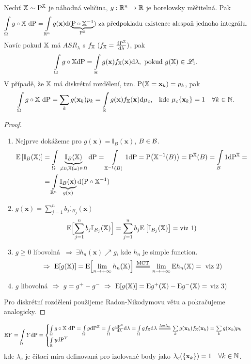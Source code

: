 \begin{theorem}
	Nechť $\mathbb{X}\sim\mathrm{P}^{\mathbb{X}}$ je náhodná veličina, $g:\mathbb{R}^n\to\mathbb{R}$ je borelovsky měřitelná. Pak $$ \int\limits_{\Omega}g\circ \mathbb{X} ~\mathrm{d} \mathrm{P} = \int\limits_{\mathbb{R}^n} g(\textbf{x})\mathrm{d}(\underbrace{\mathrm{P}\circ \mathbb{X}^{-1}}_{\mathrm{P}^{\mathbb{X}}}) \text{ za předpokladu existence alespoň jednoho integrálu.}$$
	Navíc pokud $\mathbb{X}$ má $ASR_\lambda$ s $f_{\mathbb{X}}~(f_{\mathbb{X}}=\frac{\mathrm{d}\mathrm{P}^{\mathbb{X}}}{\mathrm{d}\lambda})$, pak $$ \int\limits_{\Omega}g\circ \mathbb{X} \mathrm{d} \mathrm{P} = \int\limits_{\mathbb{R}} g(\textbf{x})f_{\mathbb{X}}(\textbf{x})\mathrm{d}\lambda,\text{ pokud }g(\mathbb{X})\in\mathscr{L}_1. $$ V případě, že $\mathbb{X}$ má diskrétní rozdělení, tzn. $\mathrm{P}(\mathbb{X}=\textbf{x}_k)=p_k$, pak  $$ \int\limits_{\Omega}g\circ \mathbb{X} ~\mathrm{d} \mathrm{P} =\sum\limits_{k}g(\textbf{x}_k)p_k=\int\limits_{\mathbb{R}} g(\textbf{x})f_{\mathbb{X}}(\textbf{x})\mathrm{d}\mu_c\text{,~~ kde }\mu_c\{ \textbf{x}_k \}=1~~~\forall k \in\mathbb{N}.$$
	\begin{proof}
		\begin{enumerate}
			\item Nejprve dokážeme pro $g(\textbf{x})=\mathbb{I}_B(\textbf{x})$, $B\in\mathcal{B}$. 
			\[
			\begin{split}
			\mathrm{E} \left[ \mathbb{I}_B(\mathbb{X}) \right]&=\int\limits_{\Omega}\underbrace{\mathbb{I}_B(\mathbb{X})}_{\neq 0,\mathbb{X}(\omega)\in B}\mathrm{d} \mathrm{P}=\int\limits_{\mathbb{X}^{-1}(B)} 1 \mathrm{d} \mathrm{P}= \mathrm{P}\bigl(\mathbb{X}^{-1}(B)\bigr)=\mathrm{P}^{\mathbb{X}}(B)=\int\limits_{B}1\mathrm{d}\mathrm{P}^{\mathbb{X}}=\\ &=\int\limits_{\mathbb{R}^n}\underbrace{\mathbb{I}_B(\textbf{x})}_{g(\textbf{x})}\mathrm{d}(\mathrm{P}\circ \mathbb{X}^{-1})
			\end{split}
			\]
			\item $g(\textbf{x})=\sum\limits_{j=1}^n b_j \mathbb{I}_{B_j}(\textbf{x})$ $$ \mathrm{E} \Bigl[ \sum\limits_{j=1}^n b_j \mathbb{I}_{B_j}(\mathbb{X}) \Bigr]=\sum\limits_{j=1}^n b_j \mathrm{E} \left[ \mathbb{I}_{B_j}(\mathbb{X}) \right]=\text{viz 1)} $$
			\item $g\geq 0$ libovolná $~\Rightarrow~ \exists h_n(\textbf{x})\nearrow g$, kde  $h_n$ je simple function.
			$$~\Rightarrow~ \E [g(\X)]=\E \Bigl[ \lim\limits_{ n\to +\infty} h_n(\X) \Bigr]\equal{\text{MCT}}\lim\limits_{ n\to +\infty} \E h_n(\X)=\text{ viz 2)}$$ 
			\item $g$ libovolná $~\Rightarrow~ g=g^+-g^- ~\Rightarrow~ \mathrm{E} [g(\mathbb{X})]=\mathrm{E} g^+(\mathbb{X})-\mathrm{E} g^-(\mathbb{X})=$ viz 3)
		\end{enumerate}
	Pro diskrétní rozdělení použijeme Radon-Nikodymovu větu a pokračujeme analogicky.
	\end{proof}
\end{theorem}
\begin{example}
	\[
	\E Y=\int\limits_{\Omega}Y\dif \PP=\begin{cases}
	\int\limits_{\Omega}g\circ \X~\dif \PP=\int\limits_{\Omega}g\dif\PEX=\int\limits_{\Omega}g\frac{\dif\PEX}{\dif\lambda}\dif\lambda=\int\limits_{\Omega}g\fex \dif\lambda\equal{\lambda=\lambda_c}\sum\limits_{k}g(\textbf{x}_k)\fex(\textbf{x}_k)=\sum\limits_{k}g(\textbf{x}_k)p_k \\
	\int\limits_{\R}y\dif \PP^Y
	\end{cases}
	\]
	kde $\lambda_c$ je čítací míra definovaná pro izolované body jako $\lambda_c(\{\textbf{x}_k\})=1~~~\forall k\in\mathbb{N}$.
\end{example}
